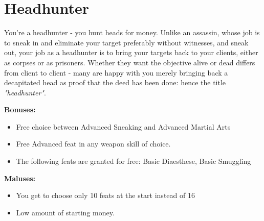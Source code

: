 \section{Headhunter}
You're a headhunter - you hunt heads for money. Unlike an assassin, whose job is to sneak in and eliminate your target preferably without witnesses, and sneak out, your job as a headhunter is to bring your targets back to your clients, either as corpses or as prisoners. Whether they want the objective alive or dead differs from client to client - many are happy with you merely bringing back a decapitated head as proof that the deed has been done: hence the title \textit{"headhunter"}.

\textbf{Bonuses:}
\begin{itemize}
	\item Free choice between Advanced Sneaking and Advanced Martial Arts
	\item Free Advanced feat in any weapon skill of choice.
	\item The following feats are granted for free: Basic Diaesthese, Basic Smuggling
\end{itemize}


\textbf{Maluses:}
\begin{itemize}
	\item You get to choose only 10 feats at the start instead of 16
	\item Low amount of starting money.
\end{itemize}
